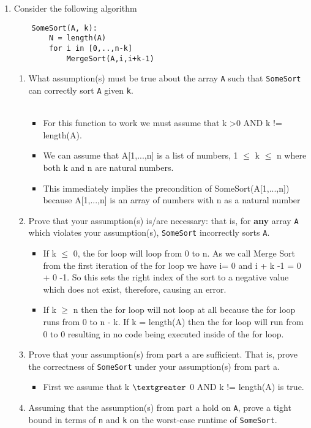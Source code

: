 \documentclass[12pt]{article}
\begin{document}
\begin{enumerate}
\item  Consider the following algorithm
\begin{small}
    \begin{verbatim}
    SomeSort(A, k):
        N = length(A)
        for i in [0,..,n-k]
            MergeSort(A,i,i+k-1)
    \end{verbatim}
\end{small}
\begin{enumerate}
    \item What assumption(s) must be true about the array {\tt A} such that 
        {\tt SomeSort} can correctly sort {\tt A} given {\tt k}.\\\\ 
    \begin{itemize}
    	\item For this function to work we must assume that k 						\textgreater 0 AND k != length(A).
		\item We can assume that A[1,...,n] is a list of numbers, 1 $\leq$ k $\leq$ n where both k and n are natural numbers.
		\item This immediately implies the precondition of SomeSort(A[1,...,n]) because A[1,...,n] is an array of numbers with n as a natural number
    \end{itemize}
    \pagebreak	
    \item Prove that your assumption(s) is/are necessary: that is, for 
        {\bf any} array {\tt A} which violates your assumption(s), 
        {\tt SomeSort} incorrectly sorts {\tt A}.\\
        \begin{itemize}
    		\item If k $\leq$ 0, the for loop will loop from 0 to n. As we call Merge Sort from the first iteration of the for loop we have i= 				  0 and i + k -1 = 0 + 0 -1. So this sets the right index of the sort to a negative value which does not exist, therefore, 					  causing an error. 
			\item If k $\geq$ n then the for loop will not loop at all because the for loop runs from 0 to n - k. If k = length(A) then the 				  for loop will run from 0 to 0 resulting in no code being executed inside of the for loop.
		\end{itemize}
    \pagebreak	
    \item Prove that your assumption(s) from part a are sufficient. That is,
          prove the correctness of {\tt SomeSort} under your assumption(s) from
          part a.
        \begin{itemize}
        	\item First we assume that k $\textgreater$ 0 AND k != length(A) is true. 
        \end{itemize}
    	    \pagebreak	
    \item Assuming that the assumption(s) from part a hold on {\tt A}, prove a
          tight bound in terms of {\tt n} and {\tt k} on the worst-case runtime
          of {\tt SomeSort}.
    \pagebreak	
\end{enumerate}


\end{enumerate}
\end{document}
